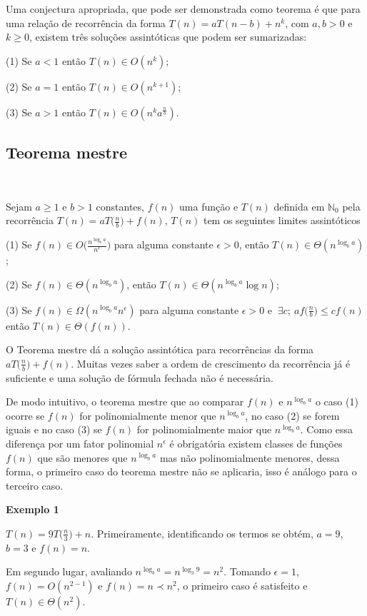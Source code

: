 Uma conjectura apropriada, que pode ser demonstrada como teorema é que para uma relação de recorrência da forma $T(n)=aT(n-b)+n^k$, com $a,b>0$ e $k\geq 0$, existem três soluções assintóticas que podem ser sumarizadas:

(1) Se $a<1$ então $T(n) \in O(n^k)$;

(2) Se $a=1$ então $T(n) \in O(n^{k+1})$;

(3) Se $a>1$ então $T(n) \in O(n^ka^{\frac{n}{b}}).$ 

\subsection{Teorema mestre}
\

Sejam $a\geq 1$ e $b>1$ constantes, $f(n)$ uma função e $T(n)$ definida em $\mathbb{N}_0$ pela recorrência $T(n) = aT\Bigr(\frac{n}{b}\Bigr) + f(n)$, $T(n)$ tem os seguintes limites assintóticos

(1) Se $f(n) \in O\Bigr(\frac{n^{\log_ba}}{n^\epsilon}\Bigr)$ para alguma constante $\epsilon>0$, então $T(n) \in \Theta(n^{\log_ba})$;

(2) Se $f(n) \in \Theta(n^{\log_ba})$, então $T(n) \in \Theta(n^{\log_ba} \log n)$;

(3) Se $f(n) \in \Omega(n^{\log_ba}n^\epsilon)$ para alguma constante $\epsilon>0$ e $ \ \exists c; \ af\Bigr(\frac{n}{b}\Bigr)\leq cf(n) $ então $T(n) \in \Theta(f(n))$.


O Teorema mestre dá a solução assintótica para recorrências da forma $aT\Bigr(\frac{n}{b}\Bigr) + f(n)$. Muitas vezes saber a ordem de crescimento da recorrência já é suficiente e uma solução de fórmula fechada não é necessária.

De modo intuitivo, o teorema mestre que ao comparar $f(n)$ e $n^{\log_ba}$ o caso (1) ocorre se $f(n)$ for polinomialmente menor que $n^{\log_ba}$, no caso (2) se forem iguais e no caso (3) se $f(n)$ for polinomialmente maior que $n^{\log_ba}$. Como essa diferença por um fator polinomial $n^\epsilon$ é obrigatória existem classes de funções $f(n)$ que são menores que $n^{\log_ba}$ mas não polinomialmente menores, dessa forma, o primeiro caso do teorema mestre não se aplicaria, isso é análogo para o terceiro caso.

\textbf{Exemplo 1}

$T(n)=9T\Bigr(\frac{n}{3}\Bigr) + n$. Primeiramente, identificando os termos se obtém, $a=9$, $b=3$ e $f(n)=n$.

Em segundo lugar, avaliando $n^{\log_ba}=n^{\log_3 9} = n^2$. Tomando $\epsilon = 1$, $f(n) = O(n^{2-1})$ e $f(n) = n \prec n^2$, o primeiro caso é satisfeito e $T(n) \in \Theta(n^2).$

